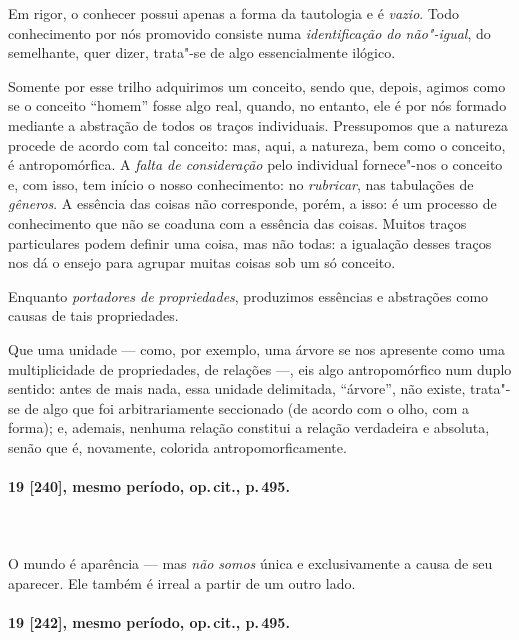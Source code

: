 Em rigor, o conhecer possui apenas a forma da tautologia e é
\textit{vazio}. Todo conhecimento por nós promovido consiste numa
\textit{identificação do não"-igual}, do semelhante, quer dizer,
trata"-se de algo essencialmente ilógico. 

Somente por esse trilho adquirimos um conceito, sendo que, depois,
agimos como se o conceito “homem” fosse algo real, quando, no entanto,
ele é por nós formado mediante a abstração de todos os traços
individuais. Pressupomos que a natureza procede de acordo com tal
conceito: mas, aqui, a natureza, bem como o conceito, é antropomórfica.
A \textit{falta de consideração} pelo individual fornece"-nos o
conceito e, com isso, tem início o nosso conhecimento: no
\textit{rubricar}, nas tabulações de \textit{gêneros}. A essência das
coisas não corresponde, porém, a isso: é um processo de conhecimento
que não se coaduna com a essência das coisas. Muitos traços
particulares podem definir uma coisa, mas não todas: a igualação
desses traços nos dá o ensejo para agrupar muitas coisas sob um só
conceito.

Enquanto \textit{portadores de propriedades}, produzimos essências e
abstrações como causas de tais propriedades.

Que uma unidade --- como, por exemplo, uma árvore se nos apresente
como uma multiplicidade de propriedades, de relações ---, eis algo
antropomórfico num duplo sentido: antes de mais nada, essa unidade
delimitada, “árvore”, não existe, trata"-se de algo que foi
arbitrariamente seccionado (de acordo com o olho, com a forma); e,
ademais, nenhuma relação constitui a relação verdadeira e absoluta,
senão que é, novamente, colorida antropomorficamente. 

\pagebreak
\paragraph*{19 [240], mesmo período, op.\,cit., p.\,495.}
\ \\
 \ \\

O mundo é aparência --- mas \textit{não} \textit{somos} única e
exclusivamente a causa de seu aparecer. Ele também é irreal a partir de
um outro lado.

\pagebreak
\paragraph*{19 [242], mesmo período, op.\,cit., p.\,495.}
\ \\
\ \\

